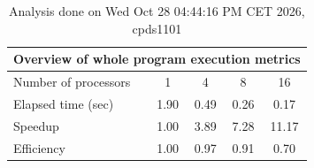 \begin{table}[h]
\begin{center}
\begin{tabular}{|l|c|c|c|c|}
\hline
\multicolumn{5}{|c|}{Overview of whole program execution metrics} \\
\hline
\hline
Number of processors & 1 & 4 & 8 & 16 \\
\hline
Elapsed time (sec)      &       1.90 &       0.49 &       0.26 &       0.17 \\
\hline
Speedup                 &       1.00 &       3.89 &       7.28 &      11.17 \\
\hline
Efficiency              &       1.00 &       0.97 &       0.91 &       0.70 \\
\hline
\end{tabular}
\end{center}
\caption{ Analysis done on Wed Oct 28 04:44:16 PM CET 2026, cpds1101}
\end{table}
